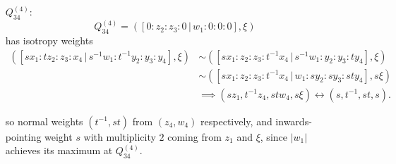 \documentclass{article}
\begin{document}
\begin{itemize}
		\item[$Q_{34}^{(4)}$:]
		\[
			Q_{34}^{(4)} = \left( [ 0 : z_{2} : z_{3} : 0 \, | \, w_{1} : 0 : 0 : 0 ], \xi \right)
		\]
		has isotropy weights
		\begin{align*}
			\left( [sx_{1} : tz_{2} : z_{3} : x_{4} \, | \, s^{-1}w_{1} : t^{-1}y_{2} : y_{3} : y_{4}], \xi \right) &\sim \left( [sx_{1} : z_{2} : z_{3} : t^{-1}x_{4} \, | \, s^{-1}w_{1} : y_{2} : y_{3} : ty_{4}], \xi \right) \\ &\sim \left( [sx_{1} : z_{2} : z_{3} : t^{-1}x_{4} \, | \, w_{1} : sy_{2} : sy_{3} : sty_{4}], s\xi \right) \\ &\implies (sz_{1}, t^{-1}z_{4}, stw_{4}, s\xi) \longleftrightarrow (s, t^{-1}, st, s).
		\end{align*}
		
		so normal weights $(t^{-1}, st)$ from $(z_{4}, w_{4})$ respectively, and inwards-pointing weight $s$ with multiplicity $2$ coming from $z_{1}$ and $\xi$, since $|w_{1}|$ achieves its maximum at $Q_{34}^{(4)}$.
	
	
	\end{itemize}
	

	
	
	
	
	
	
	
	
	
	
	
	
	
	
	
	
	
	
	
	
	
	
	  
	
	
\end{document}
